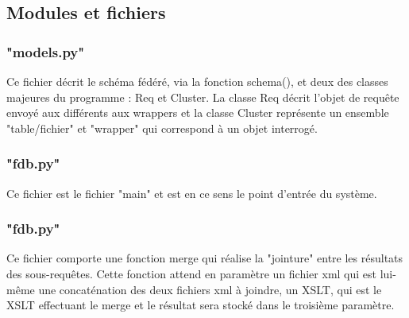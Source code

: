 \subsection{Modules et fichiers}

\subsubsection{"models.py"}

Ce fichier décrit le schéma fédéré, via la fonction schema(), et deux des classes majeures du programme : Req et Cluster. La classe Req décrit l'objet de requête envoyé aux différents aux wrappers et la classe Cluster représente un ensemble "table/fichier" et "wrapper" qui correspond à un objet interrogé.

\subsubsection{"fdb.py"}

Ce fichier est le fichier "main" et est en ce sens le point d'entrée du système.

\subsubsection{"fdb.py"}

Ce fichier comporte une fonction merge qui réalise la "jointure" entre les résultats des sous-requêtes. Cette fonction attend en paramètre un fichier xml qui est lui-même une concaténation des deux fichiers xml à joindre, un XSLT, qui est le XSLT effectuant le merge et le résultat sera stocké dans le troisième paramètre.